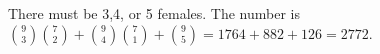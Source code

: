 There must be 3,4, or 5 females. The number is $\binom93\binom72+\binom94\binom71+\binom95=1764+882+126=\boxed{2772}$.

